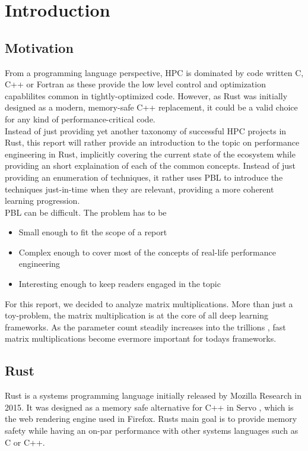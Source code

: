 \section{Introduction}
\subsection{Motivation}
From a programming language perspective, \ac{HPC} is dominated by code written C, C++ or Fortran as these provide the low level control and optimization capablilites common in tightly-optimized code. However, as Rust was initially designed as a modern, memory-safe C++ replacement, it could be a valid choice for any kind of performance-critical code.\\

Instead of just providing yet another taxonomy of successful \ac{HPC} projects in Rust, this report will rather provide an introduction to the topic on performance engineering in Rust, implicitly covering the current state of the ecosystem while providing an short explaination of each of the common concepts. Instead of just providing an enumeration of techniques, it rather uses \ac{PBL} to introduce the techniques just-in-time when they are relevant, providing a more coherent learning progression.\\

\acl{PBL} can be difficult. The problem has to be
\begin{itemize}
  \item Small enough to fit the scope of a report
  \item Complex enough to cover most of the concepts of real-life performance engineering
  \item Interesting enough to keep readers engaged in the topic
\end{itemize}

For this report, we decided to analyze matrix multiplications. More than just a toy-problem, the matrix multiplication is at the core of all deep learning frameworks. As the parameter count steadily increases into the trillions \cite{gpt4}, fast matrix multiplications become evermore important for todays frameworks.

\subsection{Rust}
Rust \cite{rust} is a systems programming language initially released by Mozilla Research in 2015. It was designed as a memory safe alternative for C++ in Servo \cite{servo}, which is the web rendering engine used in Firefox. Rusts main goal is to provide memory safety while having an on-par performance with other systems languages such as C or C++.\\


